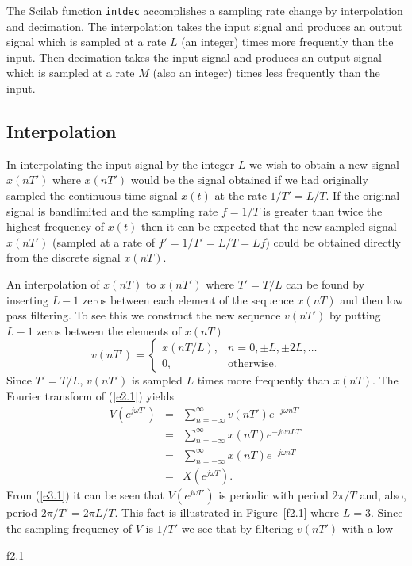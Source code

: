 	The Scilab function {\tt intdec} accomplishes
a sampling rate change by interpolation and decimation.
The interpolation takes the input signal and produces an 
output signal which is sampled at a rate $L$ (an integer) times more 
frequently than the input. Then  decimation takes the input signal and 
produces an output signal which 
is sampled at a rate $M$ (also an integer) times less frequently than the 
input.  

\subsection{Interpolation}

	In interpolating the input signal by the integer $L$
we wish to obtain a new signal $x(nT')$ where $x(nT')$ would
be the signal obtained if we had originally 
sampled the continuous-time signal $x(t)$ at the rate $1/T'=L/T$.
If the original signal is bandlimited and the sampling rate 
$f=1/T$ is greater than twice the
highest frequency of $x(t)$ then it can be expected that
the new sampled signal $x(nT')$ (sampled at a rate of
$f'=1/T'=L/T=Lf$) could be obtained directly from the discrete
signal $x(nT)$.

	An interpolation of $x(nT)$ to $x(nT')$ where $T'=T/L$
can be found by inserting $L-1$ zeros between each element of the
sequence $x(nT)$ and then low pass filtering.  To see this we construct
the new sequence $v(nT')$ by putting $L-1$ zeros between the 
elements of $x(nT)$
%
\begin{equation}
v(nT')=\left\{ \begin{array}{ll}
                     x(nT/L), & \mbox{$n=0,\pm L,\pm 2L,\ldots$}\\
                     0, & \mbox{otherwise}.
                \end{array}
       \right.
\label{e2.1}
\end{equation}
%
Since $T'=T/L$, $v(nT')$ is sampled $L$ times more frequently than 
$x(nT)$.  The Fourier transform of (\ref{e2.1}) yields
%
\begin{eqnarray}
V(e^{j\omega T'}) 
         &=& \sum_{n=-\infty}^{\infty}v(nT')e^{-j\omega nT'}\nonumber\\
         &=& \sum_{n=-\infty}^{\infty}x(nT)e^{-j\omega nLT'}\nonumber\\
         &=& \sum_{n=-\infty}^{\infty}x(nT)e^{-j\omega nT}\nonumber\\
                  &=& X(e^{j\omega T}).
\label{e3.1}
\end{eqnarray}
%
From (\ref{e3.1}) it can be seen that $V(e^{j\omega T'})$ is periodic with
period $2\pi/T$ and, also, period $2\pi/T'=2\pi L/T$.  This fact is 
illustrated in Figure~\ref{f2.1} where $L=3$.  Since the sampling frequency of 
$V$ is $1/T'$ we see that by filtering $v(nT')$ with a low
%

{f2.1}

